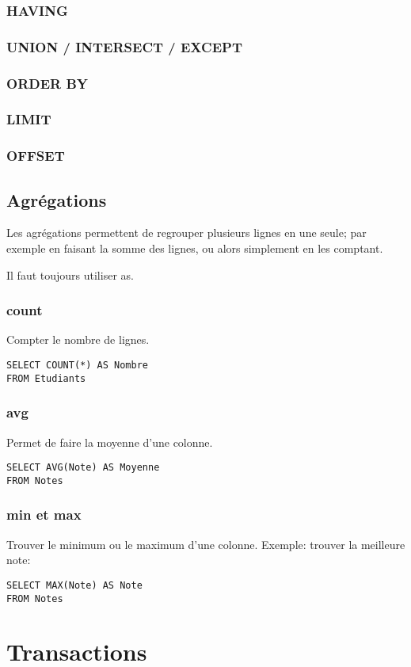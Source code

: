 \documentclass[10pt,a4paper,french]{article}
\begin{document}
\subsubsection{HAVING}

\subsubsection{UNION / INTERSECT / EXCEPT}

\subsubsection{ORDER BY}

\subsubsection{LIMIT}

\subsubsection{OFFSET}

\subsection{Agrégations}

Les agrégations permettent de regrouper plusieurs lignes en une seule; par exemple en faisant la somme des lignes, ou alors simplement en les comptant.

Il faut toujours utiliser \gls{as}.

\subsubsection{\gls{count}}
Compter le nombre de lignes.
\begin{verbatim}
SELECT COUNT(*) AS Nombre
FROM Etudiants
\end{verbatim}

\subsubsection{\gls{avg}}
Permet de faire la moyenne d'une colonne.
\begin{verbatim}
SELECT AVG(Note) AS Moyenne
FROM Notes
\end{verbatim}

\subsubsection{\gls{min} et \gls{max}}
Trouver le minimum ou le maximum d'une colonne. Exemple: trouver la meilleure note:
\begin{verbatim}
SELECT MAX(Note) AS Note
FROM Notes
\end{verbatim}

\section{}

\section{Transactions}

\appendix %

\printglossaries
\end{document}
